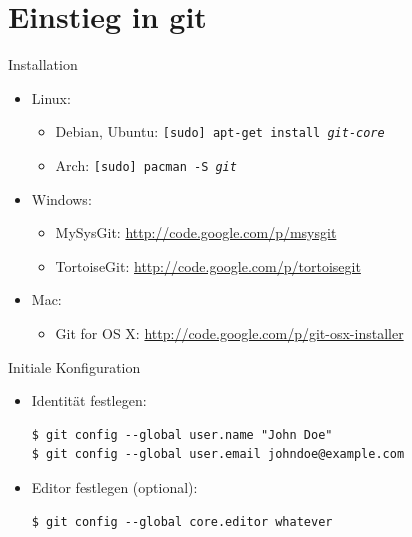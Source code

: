 \section{Einstieg in git}

\begin{frame}
  \tableofcontents[currentsection]
\end{frame}

\begin{frame}{Installation}
  \begin{itemize}
    \item Linux:
    \begin{itemize}
      \item Debian, Ubuntu: \texttt{[sudo] apt-get install \textit{git-core}}
      \item Arch: \texttt{[sudo] pacman -S \textit{git}}
    \end{itemize}
    \item Windows:
    \begin{itemize}
      \item MySysGit: \url{http://code.google.com/p/msysgit}
      \item TortoiseGit: \url{http://code.google.com/p/tortoisegit}
    \end{itemize}
    \item Mac:
    \begin{itemize}
      \item Git for OS X: \url{http://code.google.com/p/git-osx-installer}
    \end{itemize}
  \end{itemize}
\end{frame}

\begin{frame}[fragile]{Initiale Konfiguration}
  \begin{itemize}
    \item Identität festlegen:
    \begin{lstlisting}
$ git config --global user.name "John Doe"
$ git config --global user.email johndoe@example.com
    \end{lstlisting}
    \item Editor festlegen (optional):
    \begin{lstlisting}
$ git config --global core.editor whatever
    \end{lstlisting}
    \end{itemize}
\end{frame}

